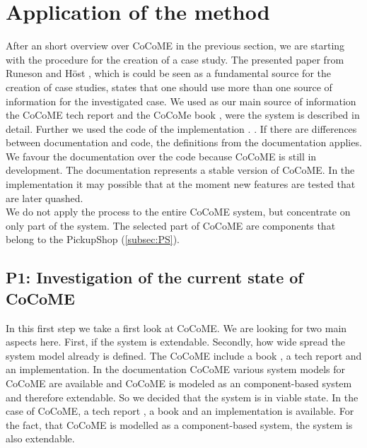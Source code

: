 \section{Application of the method}
\label{apllMethod}
After an short overview over CoCoME in the previous section, we are starting with the procedure for the creation of a case study. The presented paper from Runeson and H\"ost \cite{CaseStudySoftware}, which is could be seen as a fundamental source for the creation of case studies, states that one should use more than one source of information for the investigated case. We used as our main source of information the CoCoME tech report \cite{CoCoMETechReport} and the CoCoMe book \cite{CoCoMEBook}, were the system is described in detail. Further we used the code of the implementation \cite{CoCoME_impl}.
. If there are differences between documentation and code, the definitions from the documentation applies. We favour the documentation over the code because CoCoME is still in development. The documentation represents a stable version of CoCoME. In the implementation it may possible that at the moment new features are tested that are later quashed.\\  We do not apply the process to the entire CoCoME system, but concentrate on only part of the system. The selected part of CoCoME are components that belong to the PickupShop (\autoref{subsec:PS}).
\subsection{P1: Investigation of the current state of CoCoME}
In this first step we take a first look at CoCoME. We are looking for two main aspects here. First, if the system is extendable. Secondly, how wide spread the system model already is defined. The CoCoME include a book \cite{CoCoMEBook}, a tech report \cite{CoCoMETechReport} and an implementation. In the documentation CoCoME various system models for CoCoME are available and CoCoME is modeled as an component-based system and therefore extendable. So we decided that the system is in viable state.%
In the case of CoCoME, a tech report \cite{CoCoMETechReport}, a book \cite{CoCoMEBook} and an implementation is available. For the fact, that CoCoME is modelled as a component-based system, the system is also  extendable.
